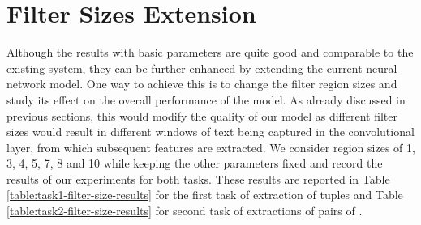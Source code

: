 \section{Filter Sizes Extension}
\label{section:filter-sizes-extension}
Although the results with basic parameters are quite good and comparable to the existing system, they can be further enhanced by extending the current neural network model. One way to achieve this is to change the filter region sizes and study its effect on the overall performance of the model. As already discussed in previous sections, this would modify the quality of our model as different filter sizes would result in different windows of text being captured in the convolutional layer, from which subsequent features are extracted. We consider region sizes of 1, 3, 4, 5, 7, 8 and 10 while keeping the other parameters fixed and record the results of our experiments for both tasks. These results are reported in Table \ref{table:task1-filter-size-results} for the first task of extraction of {\it <stage, ethnicity>} tuples and Table \ref{table:task2-filter-size-results} for second task of extractions of pairs of {\it <stage, sample size>}. 

